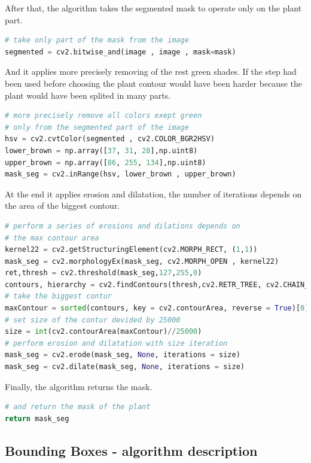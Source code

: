 \documentclass[12pt]{article}
\begin{document}
After that, the algorithm takes the segmented mask to operate only on the plant part.

\begin{lstlisting}[language=Python]
# take only part of the mask from the image
segmented = cv2.bitwise_and(image , image , mask=mask)
\end{lstlisting}

And it applies more precisely removing of the rest green shades. If the step had been used before choosing the plant contour would have been harder because the plant would have been splited in many parts.

\begin{lstlisting}[language=Python]
# more precisely remove all colors exept green
# only from the segmented part of the image
hsv = cv2.cvtColor(segmented , cv2.COLOR_BGR2HSV)
lower_brown = np.array([37, 31, 28],np.uint8)
upper_brown = np.array([86, 255, 134],np.uint8)
mask_seg = cv2.inRange(hsv, lower_brown , upper_brown)
\end{lstlisting}

At the end it applies erosion and dilatation, the number of iterations depends on the area of the biggest contour.

\begin{lstlisting}[language=Python]
# perform a series of erosions and dilations depends on
# the max contour area
kernel22 = cv2.getStructuringElement(cv2.MORPH_RECT, (1,1))
mask_seg = cv2.morphologyEx(mask_seg, cv2.MORPH_OPEN , kernel22)
ret,thresh = cv2.threshold(mask_seg,127,255,0)
contours, hierarchy = cv2.findContours(thresh,cv2.RETR_TREE, cv2.CHAIN_APPROX_SIMPLE)
# take the biggest contur
maxContour = sorted(contours, key = cv2.contourArea, reverse = True)[0]
# set size of the contur devided by 25000
size = int(cv2.contourArea(maxContour)//25000)
# perform erosion and dilatation with size iteration
mask_seg = cv2.erode(mask_seg, None, iterations = size)
mask_seg = cv2.dilate(mask_seg, None, iterations = size)
\end{lstlisting}

Finally, the algorithm returns the mask.

\begin{lstlisting}[language=Python]
# and return the mask of the plant
return mask_seg
\end{lstlisting}

\subsection{Bounding Boxes - algorithm description}
\end{document}
